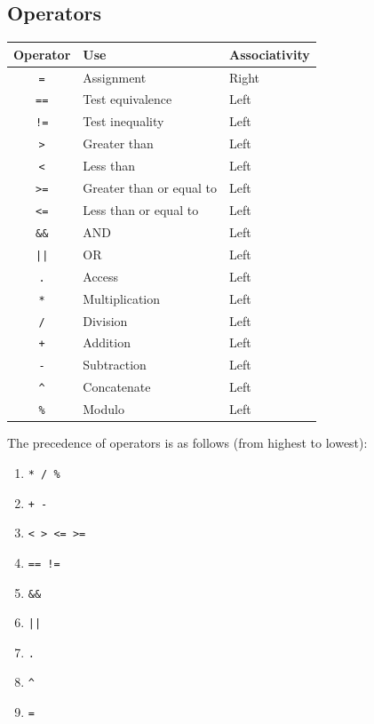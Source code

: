 \documentclass[11pt]{report}
\begin{document}
\subsection{Operators}
\begin{center}
\begin{tabular}{ c|l|l }
Operator & Use & Associativity \\
\hline
\texttt{=} & Assignment    & Right \\
\texttt{==} & Test equivalence  & Left \\
\texttt{!=} & Test inequality   & Left \\
\texttt{>} & Greater than   & Left \\
\texttt{<} & Less than   & Left \\
\texttt{>=} & Greater than or equal to & Left \\
\texttt{<=} & Less than or equal to  & Left \\
\texttt{\&\&} & AND    & Left \\
\texttt{||} & OR    & Left \\
\texttt{.} & Access    & Left \\
\texttt{*} & Multiplication   & Left \\
\texttt{/} & Division    & Left \\
\texttt{+} & Addition    & Left \\
\texttt{-} & Subtraction   & Left \\
\texttt{\^} & Concatenate   & Left \\
\texttt{\%} & Modulo    & Left \\
\end{tabular}
\end{center}

The precedence of operators is as follows (from highest to lowest):
\begin{enumerate}
 \item \texttt{* / \%}
 \item \texttt{+ -}
 \item \texttt{< > <= >=}
 \item \texttt{== !=}
 \item \texttt{\&\&}
 \item \texttt{||}
 \item \texttt{.}
 \item \texttt{\^}
 \item \texttt{=}
\end{enumerate}
\end{document}
